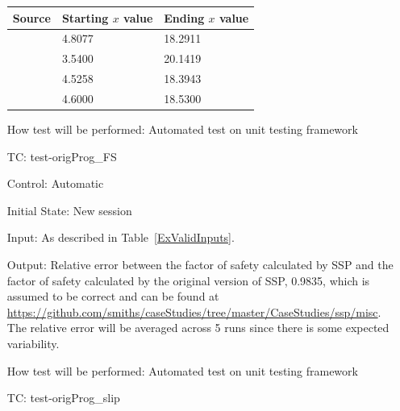 \documentclass[12pt, titlepage]{article}
\newcounter{testnum} %
\newcommand{\progname}{SSP}
\begin{document}
\begin{enumerate}[label=TC\arabic*:,ref={\arabic*}]


\begin{tabularx}{1.0\textwidth}{l p{3.5cm} p{3.5cm}}
	\toprule \textbf{Source} & \textbf{Starting $x$ value} & 
	\textbf{Ending $x$ value}\\ \midrule
	\cite{Greco1996} & 4.8077 & 18.2911\\
	\cite{MalkawiEtAl} & 3.5400 & 20.1419\\
	\cite{ChengEtAl} & 4.5258 & 18.3943\\
	\cite{LiEtAl} & 4.6000 & 18.5300\\
	\bottomrule
\end{tabularx}

How test will be performed: Automated test on unit testing framework

\item [TC\refstepcounter{testnum}\thetestnum: \label{TC_OrigProgFS}] 
test-origProg\_FS

Control: Automatic

Initial State: New session

Input: As described in Table~\ref{ExValidInputs}.

Output: Relative error between the factor of safety calculated by \progname{} 
and the factor of safety calculated by the original version of \progname{}, 
0.9835, which is assumed to be correct and can be found at \newline
\href{https://github.com/smiths/caseStudies/tree/master/CaseStudies/ssp/misc}
{https://github.com/smiths/caseStudies/tree/master/CaseStudies/ssp/misc}. The 
relative error will be averaged across 5 runs since there is some expected 
variability.

How test will be performed: Automated test on unit testing framework

\item [TC\refstepcounter{testnum}\thetestnum: \label{TC_OrigProgSlip}] 
test-origProg\_slip


\end{enumerate}
\end{document}
